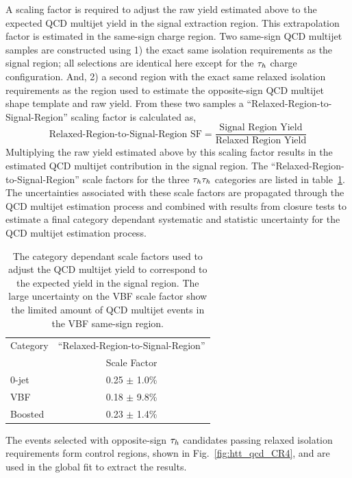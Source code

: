 A scaling factor is required to adjust the raw yield estimated above to the expected
QCD multijet yield in the signal extraction region. This extrapolation factor
is estimated in the same-sign charge region. Two same-sign QCD multijet samples are constructed
using 1) the exact same isolation requirements as the signal region; all selections are identical
here except for the $\tau_{h}$ charge configuration. And, 2) a second region with the exact 
same relaxed isolation requirements as the region used to estimate the opposite-sign
QCD multijet shape template and raw yield. From these two samples a ``Relaxed-Region-to-Signal-Region''
scaling factor is calculated as,
\begin{equation}
\label{eqn:htt_tt_qcd_sf}
\text{Relaxed-Region-to-Signal-Region SF} = \frac{\text{Signal Region Yield}}{\text{Relaxed Region Yield}}
\end{equation}
Multiplying the raw yield estimated above by this scaling factor results in the estimated
QCD multijet contribution in the signal region. The ``Relaxed-Region-to-Signal-Region'' scale factors
for the three $\tau_{h}\tau_{h}$ categories are listed in table~\ref{tab:htt_qcd_sf}. The uncertainties associated
with these scale factors are propagated through the QCD multijet estimation process and combined
with results from closure tests to estimate a final category dependant systematic and statistic uncertainty
for the QCD multijet estimation process.

\begin{table}[htbp]
\centering
\begin{tabular}{|l|c|}
\hline
Category   &   ``Relaxed-Region-to-Signal-Region''   \\
           &   Scale Factor   \\
\hline
0-jet      &    0.25 $\pm$ 1.0\%  \\
VBF        &    0.18 $\pm$ 9.8\%  \\
Boosted    &    0.23 $\pm$ 1.4\%  \\  
\hline
\end{tabular}
\label{tab:htt_qcd_sf}
\caption{
The category dependant scale factors used to adjust the QCD multijet yield to correspond 
to the expected yield in the signal region. The large uncertainty on the VBF scale factor show the
limited amount of QCD multijet events in the VBF same-sign region. 
}
\end{table}

The events selected with opposite-sign $\tau_{h}$ candidates passing relaxed isolation requirements 
form control regions, shown in Fig.~\ref{fig:htt_qcd_CR4}, and are used in the global fit to extract the results.

